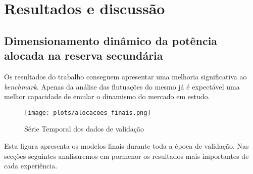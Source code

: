 \chapter{Resultados e discussão}

\thispagestyle{plain}


\newpage
\section{Dimensionamento dinâmico da potência alocada na reserva secundária}

Os resultados do trabalho conseguem apresentar uma melhoria significativa ao \textit{benchmark}. Apenas da análise das flutuações do mesmo já é expectável uma melhor capacidade de emular o dinamismo do mercado em estudo.\par

\begin{figure}[H]
    \centering
    \texttt{[image: plots/alocacoes\_finais.png]}
    \caption{Série Temporal dos dados de validação}
    \label{fig:modeltimeseries}
\end{figure}

Esta figura apresenta os modelos finais durante toda a época de validação. Nas secções seguintes analisaremos em pormenor os resultados mais importantes de cada experiência.\par

\thispagestyle{plain}


\thispagestyle{plain}


